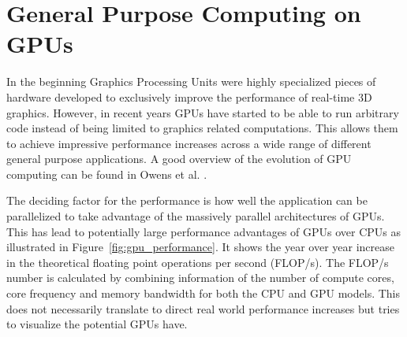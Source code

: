 \documentclass[a4paper,11pt]{kth-mag}
\begin{document}
\section{General Purpose Computing on GPUs}
In the beginning Graphics Processing Units were highly specialized pieces of hardware developed to exclusively improve the performance of real-time 3D graphics. However, in recent years GPUs have started to be able to run arbitrary code instead of being limited to graphics related computations. This allows them to achieve impressive performance increases across a wide range of different general purpose applications. A good overview of the evolution of GPU computing can be found in Owens et al. \cite{Owens2008}. 

The deciding factor for the performance is how well the application can be parallelized to take advantage of the massively parallel architectures of GPUs. This has lead to potentially large performance advantages of GPUs over CPUs as illustrated in Figure~\ref{fig:gpu_performance}. It shows the year over year increase in the theoretical floating point operations per second (FLOP/s). The FLOP/s number is calculated by combining information of the number of compute cores, core frequency and memory bandwidth for both the CPU and GPU models. This does not necessarily translate to direct real world performance increases but tries to visualize the potential GPUs have.
\end{document}
